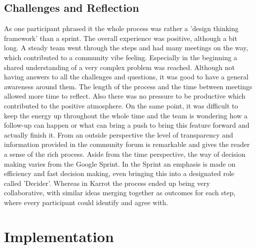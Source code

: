 \documentclass[
	a4paper,%
	11pt,%
	]{article}
\begin{document}
\subsection{Challenges and Reflection}

As one participant phrased it the whole process was rather a 'design thinking framework' than a sprint. The overall experience was positive, although a bit long. A steady team went through the steps and had many meetings on the way, which contributed to a community vibe feeling. Especially in the beginning a shared understanding of a very complex problem was reached. Although not having answers to all the challenges and questions, it was good to have a general awareness around them. The length of the process and the time between meetings allowed more time to reflect. Also there was no pressure to be productive which contributed to the positive atmosphere. On the same point, it was difficult to keep the energy up throughout the whole time and the team is wondering how a follow-up can happen or what can bring a push to bring this feature forward and actually finish it. From an outside perspective the level of transparency and information provided in the community forum is remarkable and gives the reader a sense of the rich process. Aside from the time perspective, the way of decision making varies from the Google Sprint. In the Sprint an emphasis is made on efficiency and fast decision making, even bringing this into a designated role called 'Decider'. Whereas in Karrot the process ended up being very collaborative, with similar ideas merging together as outcomes for each step, where every participant could identify and agree with.



\section{Implementation}
\end{document}
